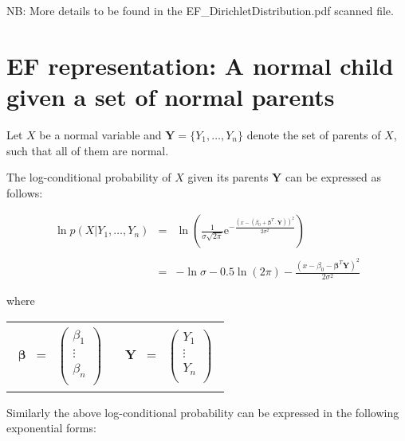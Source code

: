 \documentclass[11pt, oneside]{article}   	%
\newcommand{\bm}{\mathbf}
\newcommand{\bs}{\boldsymbol}
\newcommand{\me}{\mathrm{e}}
\numberwithin{figure}{section}
\numberwithin{equation}{section}
\numberwithin{table}{section}
\theoremstyle{definition}
\begin{document}
\begin{appendices}
NB: More details to be found in the EF\_DirichletDistribution.pdf scanned file.

\newpage


\section{EF representation: A normal child given a set of normal parents}

Let $X$ be a normal variable and $ \mathbf{Y} = \{Y_1,\ldots,Y_n\}$ denote the set of parents of $X$, such that all of them are normal. 

The log-conditional probability of $X$ given its parents $\mathbf{Y}$ can be expressed as follows:

\begin{eqnarray*}
\ln p(X|Y_1,\ldots,Y_n) &=& \ln \left(\frac{1}{\sigma \sqrt{2\pi}} \me^{-\frac{(x-(\beta_0+ \bs \beta^T \cdot \bm Y))^2}{2\sigma^2}} \right)\\\\
&=&
- \ln{\sigma} - 0.5\ln{(2\pi)} - \frac{(x-\beta_0 - \bs \beta^T \mathbf{Y})^2}{2\sigma^2}
\end{eqnarray*}

where

\begin{tabular}{p{5.5cm}p{5.5cm}}
\begin{eqnarray*}
\bs \beta &=& 
\begin{pmatrix}
\beta_1\\
\vdots\\
\beta_n\\
\end{pmatrix}
\end{eqnarray*}
&
\begin{eqnarray*}
\bm Y &=& 
\begin{pmatrix}
Y_1\\
\vdots\\
Y_n\\
\end{pmatrix}
\end{eqnarray*}
\\
\end{tabular}

Similarly the above log-conditional probability can be expressed in the following exponential forms:



\end{appendices}
\end{document}
